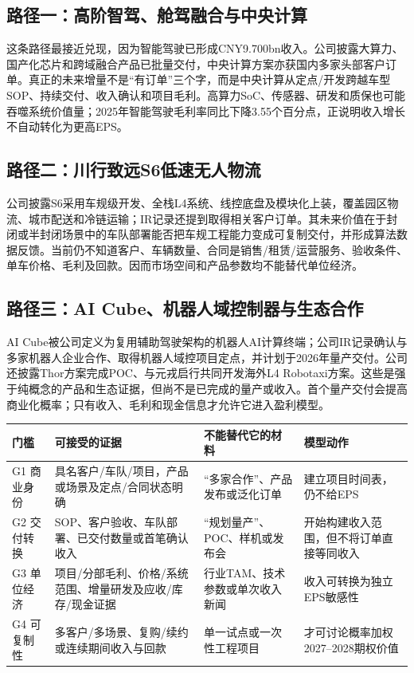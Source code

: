 \subsection{路径一：高阶智驾、舱驾融合与中央计算}

这条路径最接近兑现，因为智能驾驶已形成CNY9.700bn收入。公司披露大算力、国产化芯片和跨域融合产品已批量交付，中央计算方案亦获国内多家头部客户订单。真正的未来增量不是“有订单”三个字，而是中央计算从定点/开发跨越车型SOP、持续交付、收入确认和项目毛利。高算力SoC、传感器、研发和质保也可能吞噬系统价值量；2025年智能驾驶毛利率同比下降3.55个百分点，正说明收入增长不自动转化为更高EPS。

\subsection{路径二：川行致远S6低速无人物流}

公司披露S6采用车规级开发、全栈L4系统、线控底盘及模块化上装，覆盖园区物流、城市配送和冷链运输；IR记录还提到取得相关客户订单。其未来价值在于封闭或半封闭场景中的车队部署能否把车规工程能力变成可复制交付，并形成算法数据反馈。当前仍不知道客户、车辆数量、合同是销售/租赁/运营服务、验收条件、单车价格、毛利及回款。因而市场空间和产品参数均不能替代单位经济。

\subsection{路径三：AI Cube、机器人域控制器与生态合作}

AI Cube被公司定义为复用辅助驾驶架构的机器人AI计算终端；公司IR记录确认与多家机器人企业合作、取得机器人域控项目定点，并计划于2026年量产交付。公司还披露Thor方案完成POC、与元戎启行共同开发海外L4 Robotaxi方案。这些是强于纯概念的产品和生态证据，但尚不是已完成的量产或收入。首个量产交付会提高商业化概率；只有收入、毛利和现金信息才允许它进入盈利模型。

\begin{exhibitbox}[从故事到估值的四道门]
\small
\begin{tabularx}{\textwidth}{L{2.0cm}Y Y Y}
\toprule
门槛 & 可接受的证据 & 不能替代它的材料 & 模型动作 \\
\midrule
G1 商业身份 & 具名客户/车队/项目，产品或场景及定点/合同状态明确 & ``多家合作''、产品发布或泛化订单 & 建立项目时间表，仍不给EPS \\
G2 交付转换 & SOP、客户验收、车队部署、已交付数量或首笔确认收入 & ``规划量产''、POC、样机或发布会 & 开始构建收入范围，但不将订单直接等同收入 \\
G3 单位经济 & 项目/分部毛利、价格/系统范围、增量研发及应收/库存/现金证据 & 行业TAM、技术参数或单次收入新闻 & 收入可转换为独立EPS敏感性 \\
G4 可复制性 & 多客户/多场景、复购/续约或连续期间收入与回款 & 单一试点或一次性工程项目 & 才可讨论概率加权2027--2028期权价值 \\
\bottomrule
\end{tabularx}
\end{exhibitbox}

